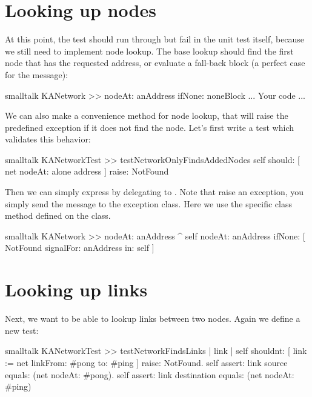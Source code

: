 \documentclass[10pt,twoside,english]{_support/latex/sbabook/sbabook}
\begin{document}
\section{Looking up nodes}
At this point, the test  should run through  but fail in the unit test itself, because we still need to implement node lookup. The base lookup should find the first node that has the requested address, or evaluate a fall-back block (a perfect case for the  message):

\begin{displaycode}{smalltalk}
KANetwork >> nodeAt: anAddress ifNone: noneBlock
    ... Your code ...
\end{displaycode}

We can also make a convenience  method for node lookup, that will raise the predefined  exception if it does not find the node.
Let's first write a test which validates this behavior:

\begin{displaycode}{smalltalk}
KANetworkTest >> testNetworkOnlyFindsAddedNodes
    self
        should: [ net nodeAt: alone address ]
        raise: NotFound
\end{displaycode}

Then we can simply express  by delegating to .
Note that raise an exception, you simply send the message  to the exception class. Here we use
the specific class method  defined on the  class.

\begin{displaycode}{smalltalk}
KANetwork >> nodeAt: anAddress
    ^ self
        nodeAt: anAddress
        ifNone: [ NotFound signalFor: anAddress in: self ]
\end{displaycode}
\section{Looking up links}
Next, we want to be able to lookup links between two nodes.
Again we define a new test:

\begin{displaycode}{smalltalk}
KANetworkTest >> testNetworkFindsLinks
    | link |
    self
        shouldnt: [ link := net linkFrom: #pong to: #ping ]
        raise: NotFound.
    self
        assert: link source
        equals: (net nodeAt: #pong).
    self
        assert: link destination
        equals: (net nodeAt: #ping)
\end{displaycode}
\end{document}
